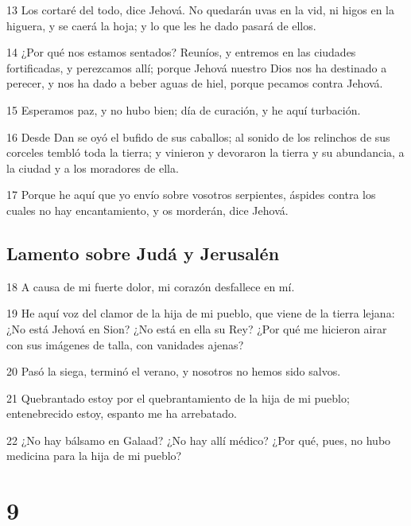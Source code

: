 \par 13 Los cortaré del todo, dice Jehová. No quedarán uvas en la vid, ni higos en la higuera, y se caerá la hoja; y lo que les he dado pasará de ellos.
\par 14 ¿Por qué nos estamos sentados? Reuníos, y entremos en las ciudades fortificadas, y perezcamos allí; porque Jehová nuestro Dios nos ha destinado a perecer, y nos ha dado a beber aguas de hiel, porque pecamos contra Jehová.
\par 15 Esperamos paz, y no hubo bien; día de curación, y he aquí turbación.
\par 16 Desde Dan se oyó el bufido de sus caballos; al sonido de los relinchos de sus corceles tembló toda la tierra; y vinieron y devoraron la tierra y su abundancia, a la ciudad y a los moradores de ella.
\par 17 Porque he aquí que yo envío sobre vosotros serpientes, áspides contra los cuales no hay encantamiento, y os morderán, dice Jehová.

\section*{Lamento sobre Judá y Jerusalén}

\par 18 A causa de mi fuerte dolor, mi corazón desfallece en mí.
\par 19 He aquí voz del clamor de la hija de mi pueblo, que viene de la tierra lejana: ¿No está Jehová en Sion? ¿No está en ella su Rey? ¿Por qué me hicieron airar con sus imágenes de talla, con vanidades ajenas?
\par 20 Pasó la siega, terminó el verano, y nosotros no hemos sido salvos.
\par 21 Quebrantado estoy por el quebrantamiento de la hija de mi pueblo; entenebrecido estoy, espanto me ha arrebatado.
\par 22 ¿No hay bálsamo en Galaad? ¿No hay allí médico? ¿Por qué, pues, no hubo medicina para la hija de mi pueblo?

\chapter{9}

